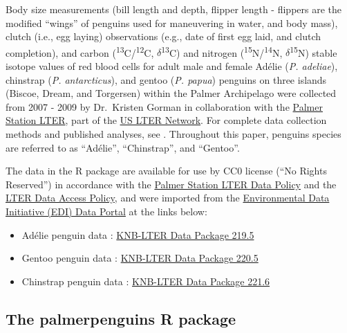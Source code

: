 Body size measurements (bill length and depth, flipper length - flippers
are the modified ``wings'' of penguins used for maneuvering in water,
and body mass), clutch (i.e., egg laying) observations (e.g., date of
first egg laid, and clutch completion), and carbon
(\textsuperscript{13}C/\textsuperscript{12}C,
\(\delta\)\textsuperscript{13}C) and nitrogen
(\textsuperscript{15}N/\textsuperscript{14}N,
\(\delta\)\textsuperscript{15}N) stable isotope values of red blood
cells for adult male and female Adélie (\emph{P. adeliae}), chinstrap
(\emph{P. antarcticus}), and gentoo (\emph{P. papua}) penguins on three
islands (Biscoe, Dream, and Torgersen) within the Palmer Archipelago
were collected from 2007 - 2009 by Dr.~Kristen Gorman in collaboration
with the \href{https://pal.lternet.edu/}{Palmer Station LTER}, part of
the \href{https://lternet.edu/}{US LTER Network}. For complete data
collection methods and published analyses, see
\citet{gorman_ecological_2014}. Throughout this paper, penguins species
are referred to as ``Adélie'', ``Chinstrap'', and ``Gentoo''.

The data in the  R package are available for use
by CC0 license (``No Rights Reserved'') in accordance with the
\href{https://pal.lternet.edu/data/policies}{Palmer Station LTER Data
Policy} and the \href{https://lternet.edu/data-access-policy/}{LTER Data
Access Policy}, and were imported from the
\href{https://environmentaldatainitiative.org/}{Environmental Data
Initiative (EDI) Data Portal} at the links below:

\begin{itemize}
\tightlist
\item
  Adélie penguin data
  \citep{palmer_station_antarctica_lter_structural_2020}:
  \href{https://portal.edirepository.org/nis/mapbrowse?packageid=knb-lter-pal.219.5}{KNB-LTER
  Data Package 219.5}
\item
  Gentoo penguin data
  \citep{palmer_station_antarctica_lter_structural_2020-1}:
  \href{https://portal.edirepository.org/nis/mapbrowse?packageid=knb-lter-pal.220.5}{KNB-LTER
  Data Package 220.5}
\item
  Chinstrap penguin data
  \citep{palmer_station_antarctica_lter_structural_2020-2}:
  \href{https://portal.edirepository.org/nis/mapbrowse?packageid=knb-lter-pal.221.6}{KNB-LTER
  Data Package 221.6}
\end{itemize}

\hypertarget{the-palmerpenguins-r-package}{%
\subsection{The palmerpenguins R
package}\label{the-palmerpenguins-r-package}}


